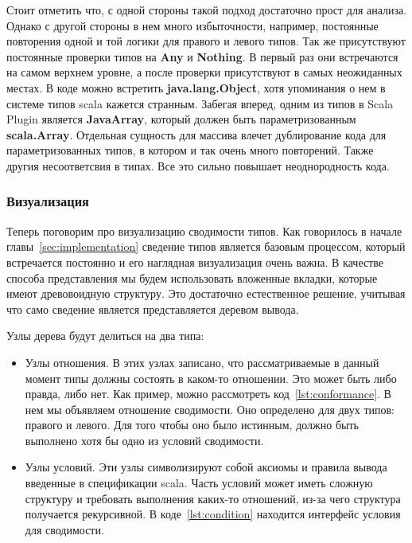 Стоит отметить что, с одной стороны такой подход достаточно прост для анализа.
Однако с другой стороны в нем много избыточности, например, постоянные повторения
одной и той логики для правого и левого типов.
Так же присутствуют постоянные проверки типов на \textbf{Any} и \textbf{Nothing}.
В первый раз они встречаются на самом верхнем уровне, а после проверки
присутствуют в самых неожиданных местах.
В коде можно встретить \textbf{java.lang.Object}, хотя упоминания о
нем в системе типов scala кажется странным.
Забегая вперед, одним из типов в Scala Plugin является \textbf{JavaArray},
который должен быть параметризованным \textbf{scala.Array}.
Отдельная сущность для массива влечет дублирование кода для параметризованных
типов, в котором и так очень много повторений.
Также другия несоответсвия в типах.
Все это сильно повышает неоднородность кода.

\subsubsection{Визуализация}

Теперь поговорим про визуализацию сводимости типов.
Как говорилось в начале главы~\ref{sec:implementation} сведение типов является
базовым процессом, который встречается постоянно и его наглядная визуализация
очень важна.
В качестве способа представления мы будем использовать вложенные вкладки,
которые имеют древовоидную структуру.
Это достаточно естественное решение, учитывая что само сведение является
представляется деревом вывода.

Узлы дерева будут делиться на два типа:
\begin{itemize}
  \item Узлы отношения.
  В этих узлах записано, что рассматриваемые в данный момент
  типы должны состоять в каком-то отношении.
  Это может быть либо правда, либо нет.
  Как пример, можно рассмотреть код~\ref{lst:conformance}.
  В нем мы объявляем отношение сводимости. Оно определено для двух типов:
  правого и левого.
  Для того чтобы оно было истинным, должно быть выполнено хотя бы одно из
  условий сводимости.
  \item Узлы условий.
  Эти узлы символизируют собой аксиомы и правила вывода введенные в спецификации
  scala.
  Часть условий может иметь сложную структуру и требовать выполнения каких-то
  отношений, из-за чего структура получается рекурсивной.
  В коде~\ref{lst:condition} находится интерфейс условия для сводимости.
\end{itemize}


